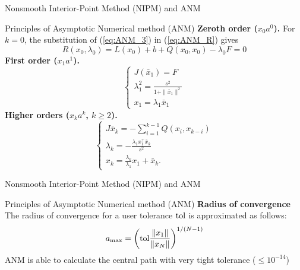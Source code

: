 \begin{frame}{Nonsmooth Interior-Point Method (NIPM) and ANM}
 \begin{block}{Principles of Asymptotic Numerical method (ANM)}
  \textbf{Zeroth order ($x_0 a^0$).}   For $k=0$, the substitution of (\ref{eq:ANM_3}) in (\ref{eq:ANM_R}) gives
\begin{equation}
  \label{eq:4}
  R(x_0,\lambda_0) = L(x_0) + b + Q(x_0,x_0) -\lambda_0 F  =0
\end{equation}
\textbf{First order ($x_1 a^1$).}
\begin{equation}
  \label{eq:6}
  \begin{cases}
  J(\bar x_1) =  F \\
  \lambda^2_1 = \frac{s^2}{1+\|\bar x_1\|^2}\\
    x_1 = \lambda_1 \bar x_1
  \end{cases}
\end{equation}
\textbf{Higher orders ($x_k a^k$, $k \geq 2$).}  
\begin{equation}
  \label{eq:15}
  \left\{
    \begin{array}{l}
      J \bar x_k =- \sum_{i=1}^{k-1}   Q(x_i,x_{k-i})\\[2mm]
      \lambda_k = - \frac{\lambda_1 x_1^\top \bar x_k}{s^2}\\[2mm]
      x_k  = \frac{\lambda_k}{\lambda_1} x_1+ \bar x_k.
  \end{array}\right.
\end{equation}




 \end{block}
\end{frame}
\begin{frame}{Nonsmooth Interior-Point Method (NIPM) and ANM}
 \begin{block}{Principles of Asymptotic Numerical method (ANM)}
\textbf{Radius of convergence}
The radius of convergence for a user tolerance $\rm tol$ is approximated as follows:
\begin{equation}
  \label{eq:16}
  a_{\max} = \left({\rm tol}\frac{\|x_1\|}{\|x_N\|} \right)^{1/(N-1)}
\end{equation}
ANM is able to calculate the central path with very tight tolerance ($\leq 10^{-14}$)
\end{block}
\end{frame}

